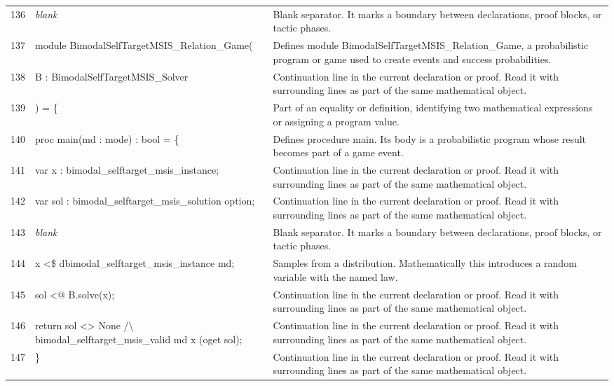 \documentclass[10pt]{article}
\begin{document}
\begin{longtable}{r L{0.53\textwidth} L{0.37\textwidth}}
136 & {\ttfamily\scriptsize \emph{blank}} & Blank separator.  It marks a boundary between declarations, proof blocks, or tactic phases. \\
137 & {\ttfamily\scriptsize module BimodalSelfTargetMSIS\_Relation\_Game(} & Defines module BimodalSelfTargetMSIS\_Relation\_Game, a probabilistic program or game used to create events and success probabilities. \\
138 & {\ttfamily\scriptsize   B : BimodalSelfTargetMSIS\_Solver} & Continuation line in the current declaration or proof.  Read it with surrounding lines as part of the same mathematical object. \\
139 & {\ttfamily\scriptsize ) = \{} & Part of an equality or definition, identifying two mathematical expressions or assigning a program value. \\
140 & {\ttfamily\scriptsize   proc main(md : mode) : bool = \{} & Defines procedure main.  Its body is a probabilistic program whose result becomes part of a game event. \\
141 & {\ttfamily\scriptsize     var x : bimodal\_selftarget\_msis\_instance;} & Continuation line in the current declaration or proof.  Read it with surrounding lines as part of the same mathematical object. \\
142 & {\ttfamily\scriptsize     var sol : bimodal\_selftarget\_msis\_solution option;} & Continuation line in the current declaration or proof.  Read it with surrounding lines as part of the same mathematical object. \\
143 & {\ttfamily\scriptsize \emph{blank}} & Blank separator.  It marks a boundary between declarations, proof blocks, or tactic phases. \\
144 & {\ttfamily\scriptsize     x <\$ dbimodal\_selftarget\_msis\_instance md;} & Samples from a distribution.  Mathematically this introduces a random variable with the named law. \\
145 & {\ttfamily\scriptsize     sol <@ B.solve(x);} & Continuation line in the current declaration or proof.  Read it with surrounding lines as part of the same mathematical object. \\
146 & {\ttfamily\scriptsize     return sol <> None /\textbackslash{} bimodal\_selftarget\_msis\_valid md x (oget sol);} & Continuation line in the current declaration or proof.  Read it with surrounding lines as part of the same mathematical object. \\
147 & {\ttfamily\scriptsize   \}} & Continuation line in the current declaration or proof.  Read it with surrounding lines as part of the same mathematical object. \\

\end{longtable}
\end{document}
